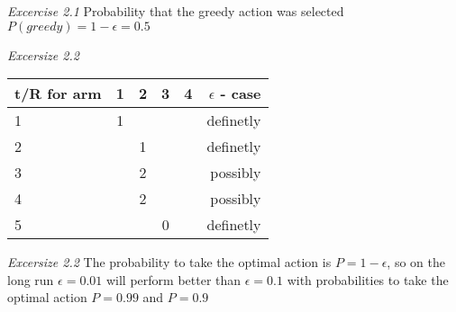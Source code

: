 \documentclass{article}
\begin{document}
\textit{Excercise 2.1} Probability that the greedy action was selected ${P(greedy) = 1 - \epsilon = 0.5}$

\textit{Excersize 2.2}

\begin{center}
\begin{tabular}{ l | c | c | c | c | r }
  t/R for arm & 1 & 2 & 3 & 4 & ${\epsilon}$ - case\\ \hline
      1       & 1 &   &   &   & definetly \\
      2       &   & 1 &   &   & definetly \\
      3       &   & 2 &   &   & possibly \\
      4       &   & 2 &   &   & possibly \\
      5       &   &   & 0 &   & definetly 
\end{tabular}
\end{center}

\textit{Excersize 2.2} The probability to take the optimal action is ${P = 1 - \epsilon}$, so on the long run ${\epsilon = 0.01}$ will perform better than ${\epsilon = 0.1}$ with probabilities to take the optimal action ${P=0.99}$ and ${P=0.9}$
\end{document}
